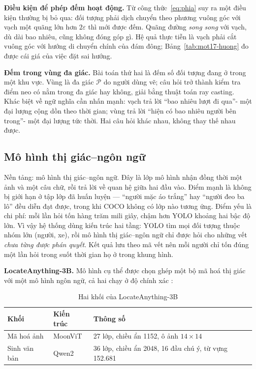 \textbf{Điều kiện để phép đếm hoạt động.} Từ công thức~\eqref{eq:phia} suy ra một điều
kiện thường bị bỏ qua: đối tượng phải dịch chuyển theo phương vuông góc với
vạch một quãng lớn hơn $2\varepsilon$ thì mới được đếm. Quãng đường \emph{song song}
với vạch, dù dài bao nhiêu, cũng không đóng góp gì. Hệ quả thực tiễn là vạch phải cắt
vuông góc với hướng di chuyển chính của đám đông; Bảng~\ref{tab:mot17-huong} đo được
cái giá của việc đặt sai hướng.

\textbf{Đếm trong vùng đa giác.} Bài toán thứ hai là đếm số đối tượng đang ở trong một
khu vực. Vùng là đa giác $\mathcal{P}$ do người dùng vẽ; câu hỏi trở thành kiểm tra
điểm neo có nằm trong đa giác hay không, giải bằng thuật toán ray casting. Khác
biệt về ngữ nghĩa cần nhấn mạnh: vạch trả lời ``bao nhiêu lượt đi qua''- một
đại lượng cộng dồn theo thời gian; vùng trả lời ``hiện có bao nhiêu người bên
trong''- một đại lượng tức thời. Hai câu hỏi khác nhau, không thay thế nhau được.

\subsection{Mô hình thị giác--ngôn ngữ}
\label{sub:vlm-lythuyet}


Nền tảng: mô hình thị giác--ngôn ngữ. Đây là lớp mô hình nhận đồng thời một ảnh
và một câu chữ, rồi trả lời về quan hệ giữa hai đầu vào. Điểm mạnh là không bị giới hạn ở
tập lớp đã huấn luyện --- ``người mặc áo trắng'' hay ``người đeo ba lô'' đều diễn đạt
được, trong khi COCO không có lớp nào tương ứng. Điểm yếu là chi phí: mỗi lần hỏi tốn
hàng trăm mili giây, chậm hơn YOLO khoảng hai bậc độ lớn. Vì vậy hệ thống dùng kiến trúc
hai tầng: YOLO tìm mọi đối tượng thuộc nhóm lớn (người, xe), rồi mô hình
thị giác--ngôn ngữ chỉ được hỏi cho những vết \emph{chưa từng được phán quyết}. Kết quả
lưu theo mã vết nên mỗi người chỉ tốn đúng một lần hỏi trong suốt thời gian họ ở trong
khung hình.

\textbf{LocateAnything-3B.} Mô hình cụ thể được chọn ghép một bộ mã hoá thị giác với một
mô hình ngôn ngữ, cả hai chạy ở độ chính xác :

\begin{table}[H]
\centering
\caption{Hai khối của LocateAnything-3B}
\label{tab:la3b-kientruc}
\small
\begin{tabularx}{\textwidth}{@{}llX@{}}
\toprule
\textbf{Khối} & \textbf{Kiến trúc} & \textbf{Thông số} \\
\midrule
Mã hoá ảnh & MoonViT & 27 lớp, chiều ẩn 1152, ô ảnh $14\times14$ \\
Sinh văn bản & Qwen2~\cite{qwen2report} & 36 lớp, chiều ẩn 2048, 16 đầu chú ý, từ vựng 152.681 \\
\bottomrule
\end{tabularx}
\end{table}

